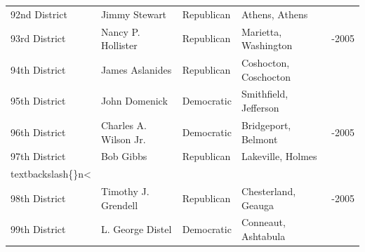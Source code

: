 \documentclass{article}
\begin{document}
\begin{tabular}{lllll}
92nd District & Jimmy Stewart & Republican & Athens, Athens &  \\
93rd District & Nancy P. Hollister & Republican & Marietta, Washington & -2005 \\
94th District & James Aslanides & Republican & Coshocton, Coschocton &  \\
95th District & John Domenick & Democratic & Smithfield, Jefferson &  \\
96th District & Charles A. Wilson Jr. & Democratic & Bridgeport, Belmont & -2005 \\
97th District & Bob Gibbs & Republican & Lakeville, Holmes\\textbackslash\{\}n< &  \\
98th District & Timothy J. Grendell & Republican & Chesterland, Geauga & -2005 \\
99th District & L. George Distel & Democratic & Conneaut, Ashtabula &  \\
\bottomrule
\end{tabular}
\end{document}
